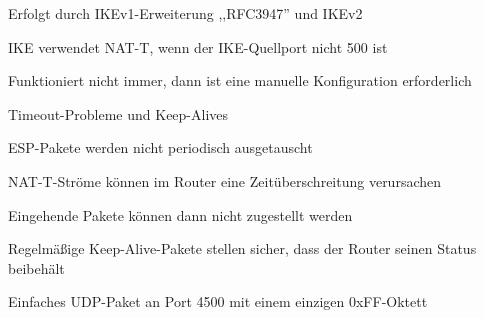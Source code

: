\documentclass[a4paper]{article}
\begin{document}
\begin{multicols}{3}
\begin{itemize*}
\begin{itemize*}
\begin{itemize*}
                        \item Erfolgt durch IKEv1-Erweiterung ,,RFC3947'' und IKEv2
                        \item IKE verwendet NAT-T, wenn der IKE-Quellport nicht 500 ist
                        \item Funktioniert nicht immer, dann ist eine manuelle Konfiguration erforderlich
                  \end{itemize*}
                  \item Timeout-Probleme und Keep-Alives
                  \begin{itemize*}
                        \item ESP-Pakete werden nicht periodisch ausgetauscht
                        \item NAT-T-Ströme können im Router eine Zeitüberschreitung verursachen
                        \item Eingehende Pakete können dann nicht zugestellt werden
                        \item Regelmäßige Keep-Alive-Pakete stellen sicher, dass der Router seinen Status beibehält
                        \item Einfaches UDP-Paket an Port 4500 mit einem einzigen 0xFF-Oktett
                  \end{itemize*}
            \end{itemize*}


\end{itemize*}
\end{multicols}
\end{document}
